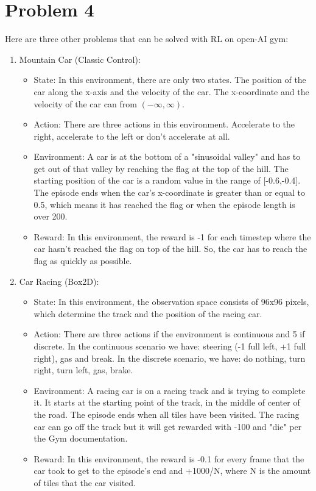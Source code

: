\documentclass{article}
\numberwithin{equation}{section}
\numberwithin{equation}{section}
\begin{document}
\section*{Problem 4}
Here are three other problems that can be solved with RL on open-AI gym:

\begin{enumerate}
\item Mountain Car (Classic Control):
\begin{itemize}
\item State: In this environment, there are only two states. The position of the car along the x-axis and the velocity of the car. The x-coordinate and the velocity of the car can from $\left(-\infty, \infty\right)$.
\item Action: There are three actions in this environment. Accelerate to the right, accelerate to the left or don't accelerate at all.  
\item Environment: A car is at the bottom of a "sinusoidal valley" and has to get out of that valley by reaching the flag at the top of the hill. The starting position of the car is a random value in the range of [-0.6,-0.4]. The episode ends when the car's x-coordinate is greater than or equal to 0.5, which means it has reached the flag or when the episode length is over 200.
\item Reward: In this environment, the reward is -1 for each timestep where the car hasn't reached the flag on top of the hill. So, the car has to reach the flag as quickly as possible.  
\end{itemize}



\item Car Racing (Box2D): 
\begin{itemize}
\item State: In this environment, the observation space consists of 96x96 pixels, which determine the track and the position of the racing car.
\item Action: There are three actions if the environment is continuous and 5 if discrete. In the continuous scenario we have: steering (-1 full left, +1 full right), gas and break. In the discrete scenario, we have: do nothing, turn right, turn left, gas, brake.
\item Environment: A racing car is on a racing track and is trying to complete it. It starts at the starting point of the track, in the middle of center of the road. The episode ends when all tiles have been visited. The racing car can go off the track but it will get rewarded with -100 and "die" per the Gym documentation.
\item Reward: In this environment, the reward is -0.1 for every frame that the car took to get to the episode's end and +1000/N, where N is the amount of tiles that the car visited.
\end{itemize}










\end{enumerate}
\end{document}
